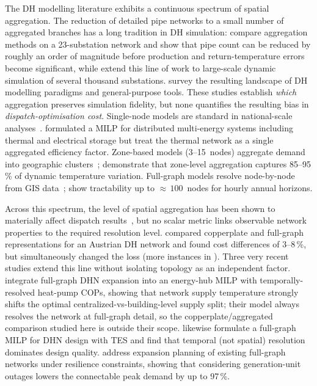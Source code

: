 \documentclass[a4paper,fleqn]{cas-dc}
\begin{document}
The DH modelling literature exhibits a continuous spectrum of
spatial aggregation. The reduction of detailed pipe networks to a
small number of aggregated branches has a long tradition in DH
simulation: \citet{Larsen2004} compare aggregation methods on a
23-substation network and show that pipe count can be reduced by
roughly an order of magnitude before production and return-temperature
errors become significant, while \citet{Falay2020} extend this line
of work to large-scale dynamic simulation of several thousand
substations. \citet{Schweiger2018_paradigms} survey the resulting
landscape of DH modelling paradigms and general-purpose tools. These
studies establish \emph{which} aggregation preserves simulation
fidelity, but none quantifies the resulting bias in
\emph{dispatch-optimisation  cost}.
Single-node models are standard in
national-scale analyses~\cite{Connolly2014_EnergyPLAN,
Brown2018_pypsa,Lund2017_SmartEnergy}.
\citet{Gabrielli2018} formulated a MILP for distributed
multi-energy systems including thermal and electrical storage but
treat the thermal network as a single aggregated efficiency
factor. Zone-based models (3--15~nodes) aggregate demand into
geographic clusters~\cite{Wirtz2020,Mertz2016,Buffa2019};
\citet{Buenning2020} demonstrate that zone-level aggregation
captures 85--95\,\% of dynamic temperature variation. Full-graph
models resolve node-by-node from GIS
data~\cite{Vesterlund2017,Schweiger2017,vanderHeijde2017,
Blommaert2020}; \citet{Giraud2015} show tractability up to
${\approx}\,100$~nodes for hourly annual horizons.

Across this spectrum, the level of spatial aggregation has been
shown to materially affect dispatch
results~\cite{Wirtz2020,Buffa2019}, but no scalar metric links
observable network properties to the required resolution level.
\citet{Leitner2019} compared copperplate and full-graph
representations for an Austrian DH network and found cost
differences of 3--8\,\%, but simultaneously changed the loss (more instances in ).
Three very recent studies extend this line without isolating
topology as an independent factor. \citet{Trentmann2026} integrate
full-graph DHN expansion into an energy-hub MILP with
temporally-resolved heat-pump COPs, showing that network supply
temperature strongly shifts the optimal centralized-vs-building-level
supply split; their model always resolves the network at
full-graph detail, so the copperplate/aggregated comparison studied
here is outside their scope. \citet{Ceruti2025} likewise formulate a
full-graph MILP for DHN design with TES and find that temporal
(not spatial) resolution dominates design quality. \citet{Vieth2026} address expansion
planning of existing full-graph networks under resilience
constraints, showing that considering generation-unit outages
lowers the connectable peak demand by up to 97\,\%. 
\end{document}
